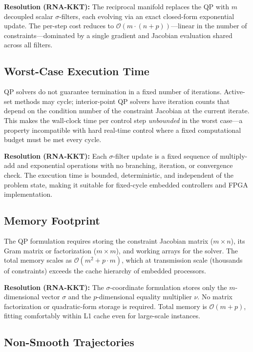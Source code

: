\documentclass[11pt,onecolumn]{article}
\theoremstyle{definition}
\theoremstyle{remark}
\begin{document}
\textbf{Resolution (RNA-KKT):} The reciprocal manifold replaces the QP with $m$ decoupled scalar $\sigma$-filters, each evolving via an exact closed-form exponential update. The per-step cost reduces to $\mathcal{O}(m \cdot (n+p))$---linear in the number of constraints---dominated by a single gradient and Jacobian evaluation shared across all filters.

\subsection{Worst-Case Execution Time}

QP solvers do not guarantee termination in a fixed number of iterations. Active-set methods may cycle; interior-point QP solvers have iteration counts that depend on the condition number of the constraint Jacobian at the current iterate. This makes the wall-clock time per control step \emph{unbounded} in the worst case---a property incompatible with hard real-time control where a fixed computational budget must be met every cycle.

\textbf{Resolution (RNA-KKT):} Each $\sigma$-filter update is a fixed sequence of multiply-add and exponential operations with no branching, iteration, or convergence check. The execution time is bounded, deterministic, and independent of the problem state, making it suitable for fixed-cycle embedded controllers and FPGA implementation.

\subsection{Memory Footprint}

The QP formulation requires storing the constraint Jacobian matrix ($m \times n$), its Gram matrix or factorization ($m \times m$), and working arrays for the solver. The total memory scales as $\mathcal{O}(m^2 + p \cdot m)$, which at transmission scale (thousands of constraints) exceeds the cache hierarchy of embedded processors.

\textbf{Resolution (RNA-KKT):} The $\sigma$-coordinate formulation stores only the $m$-dimensional vector $\sigma$ and the $p$-dimensional equality multiplier $\nu$. No matrix factorization or quadratic-form storage is required. Total memory is $\mathcal{O}(m + p)$, fitting comfortably within L1 cache even for large-scale instances.

\subsection{Non-Smooth Trajectories}
\end{document}
